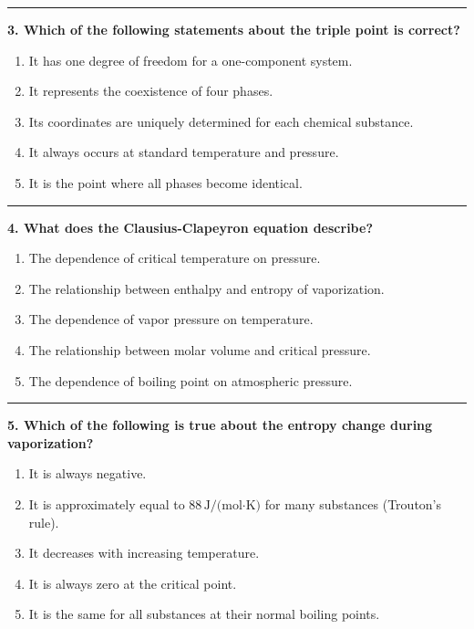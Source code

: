 \documentclass[
  9pt,
]{extbook}
\providecommand{\tightlist}{%
  \setlength{\itemsep}{0pt}\setlength{\parskip}{0pt}}
\theoremstyle{definition}
\theoremstyle{definition}
\theoremstyle{definition}
\theoremstyle{remark}
\begin{document}
\begin{center}\rule{0.5\linewidth}{0.5pt}\end{center}

\textbf{3. Which of the following statements about the triple point is correct?}

\begin{enumerate}
\def\labelenumi{\alph{enumi}.}
\tightlist
\item
  It has one degree of freedom for a one-component system.
\item
  It represents the coexistence of four phases.
\item
  Its coordinates are uniquely determined for each chemical substance.
\item
  It always occurs at standard temperature and pressure.
\item
  It is the point where all phases become identical.
\end{enumerate}

\begin{center}\rule{0.5\linewidth}{0.5pt}\end{center}

\textbf{4. What does the Clausius-Clapeyron equation describe?}

\begin{enumerate}
\def\labelenumi{\alph{enumi}.}
\tightlist
\item
  The dependence of critical temperature on pressure.
\item
  The relationship between enthalpy and entropy of vaporization.
\item
  The dependence of vapor pressure on temperature.
\item
  The relationship between molar volume and critical pressure.
\item
  The dependence of boiling point on atmospheric pressure.
\end{enumerate}

\begin{center}\rule{0.5\linewidth}{0.5pt}\end{center}

\textbf{5. Which of the following is true about the entropy change during vaporization?}

\begin{enumerate}
\def\labelenumi{\alph{enumi}.}
\tightlist
\item
  It is always negative.
\item
  It is approximately equal to \(88\,\text{J/(mol·K)}\) for many substances (Trouton's rule).
\item
  It decreases with increasing temperature.
\item
  It is always zero at the critical point.
\item
  It is the same for all substances at their normal boiling points.
\end{enumerate}
\end{document}
